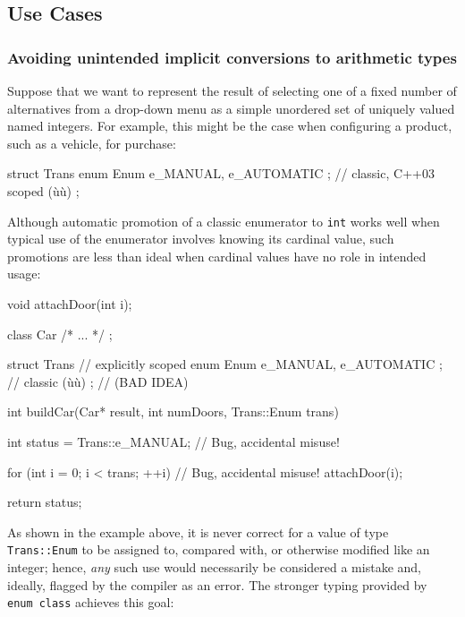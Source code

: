 \subsection[Use Cases]{Use Cases}\label{use-cases-enumclass}

\subsubsection[Avoiding unintended implicit conversions to arithmetic types]{Avoiding unintended implicit conversions to arithmetic types}\label{avoiding-unintended-implicit-conversions-to-arithmetic-types}

Suppose that we want to represent the result of selecting one of a fixed
number of alternatives from a drop-down menu as a simple unordered set
of uniquely valued named integers. For example, this might be the case
when configuring a product, such as a vehicle, for purchase:

\begin{emcppslisting}
struct Trans
{
    enum Enum { e_MANUAL, e_AUTOMATIC };  // classic, C++03 scoped (ù{}ù)
};
\end{emcppslisting}

\noindent Although automatic promotion of a classic enumerator to \texttt{int}
works well when typical use of the enumerator involves knowing its
cardinal value, such promotions are less than ideal when cardinal values
have no role in intended usage:

\begin{emcppshiddenlisting}[emcppsbatch=e5]
void attachDoor(int i);
\end{emcppshiddenlisting}
\begin{emcppslisting}[emcppsbatch=e5]
class Car { /* ... */ };

struct Trans
{                                         // explicitly scoped
    enum Enum { e_MANUAL, e_AUTOMATIC };  // classic (ù{}ù)
};                                        // (BAD IDEA)

int buildCar(Car* result, int numDoors, Trans::Enum trans)
{
    int status = Trans::e_MANUAL;    // Bug, accidental misuse!

    for (int i = 0; i < trans; ++i)  // Bug, accidental misuse!
    {
         attachDoor(i);
    }

    return status;
}
\end{emcppslisting}

\noindent As shown in the example above, it is never correct for a value of type
\texttt{Trans::Enum} to be assigned to, compared with, or otherwise
modified like an integer; hence, \emph{any} such use would necessarily
be considered a mistake and, ideally, flagged by the compiler as an
error. The stronger typing provided by \texttt{enum}~\texttt{class}
achieves this goal:

